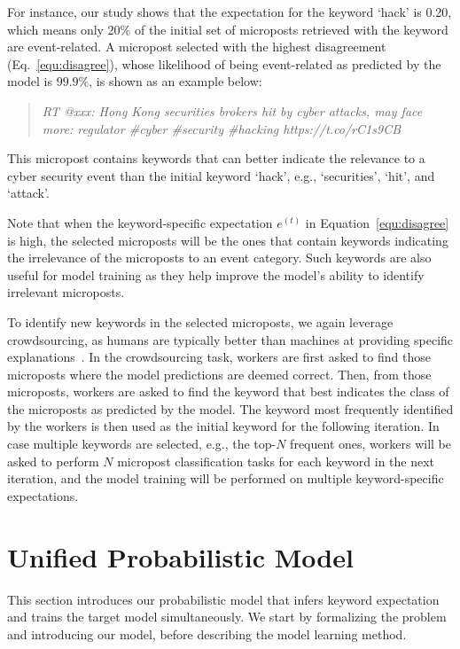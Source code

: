 \documentclass[letterpaper]{article}
\begin{document}
For instance, our study shows that the expectation for the keyword \lq hack' is 0.20, which means only 20\% of the initial set of microposts retrieved with the keyword are event-related. A micropost selected with the highest disagreement (Eq.~\ref{equ:disagree}), whose likelihood of being event-related as predicted by the model is $99.9\%$, is shown as an example below:

\begin{quote}
    \emph{RT @xxx: Hong Kong securities brokers hit by cyber attacks, may face more: regulator \#cyber \#security \#hacking https://t.co/rC1s9CB}
\end{quote}

\noindent This micropost contains keywords that can better indicate the relevance to a cyber security event than the initial keyword \lq hack', e.g., \lq securities', \lq hit', and \lq attack'.

Note that when the keyword-specific expectation $e^{(t)}$ in Equation~\ref{equ:disagree} is high, the selected microposts will be the ones that contain keywords indicating the irrelevance of the microposts to an event category. Such keywords are also useful for model training as they help improve the model's ability to identify irrelevant microposts.

To identify new keywords in the selected microposts, we again leverage crowdsourcing, as humans are typically better than machines at providing specific explanations~\cite{mcdonnell2016relevant,chang2016crowd}. In the crowdsourcing task, workers are first asked to find those microposts where the model predictions are deemed correct. Then, from those microposts, workers are asked to find the keyword that best indicates the class of the microposts as predicted by the model. The keyword most frequently identified by the workers is then used as the initial keyword for the following iteration. In case multiple keywords are selected, e.g., the top-$N$ frequent ones, workers will be asked to perform $N$ micropost classification tasks for each keyword in the next iteration, and the model training will be performed on multiple keyword-specific expectations.

\section{Unified Probabilistic Model}
\label{UPmodel}

This section introduces our probabilistic model that infers keyword expectation and trains the target model simultaneously. We start by formalizing the problem and introducing our model, before describing the model learning method.
\end{document}
